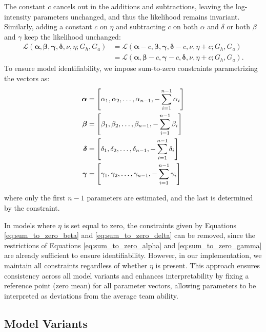 The constant $c$ cancels out in the additions and subtractions, leaving the log-intensity parameters unchanged, and thus the likelihood remains invariant.
Similarly, adding a constant $c$ on $\eta$ and subtracting $c$ on both $\alpha$ and $\delta$ or both $\beta$ and $\gamma$ keep the likelihood unchanged:
\begin{align*}
    \mathcal{L}(\boldsymbol{\alpha}, \boldsymbol{\beta}, \boldsymbol{\gamma}, \boldsymbol{\delta}, \nu, \eta ; G_h, G_a) &  = \mathcal{L}(\boldsymbol{\alpha} - c, \boldsymbol{\beta}, \boldsymbol{\gamma}, \boldsymbol{\delta} - c, \nu, \eta + c ; G_h, G_a) \\
    & = \mathcal{L}(\boldsymbol{\alpha}, \boldsymbol{\beta} - c, \boldsymbol{\gamma} - c, \boldsymbol{\delta}, \nu, \eta + c ; G_h, G_a).
\end{align*}
To ensure model identifiability, we impose sum-to-zero constraints parametrizing the vectors as:
\begin{align}
    \label{eq:sum_to_zero_alpha}
    \boldsymbol{\alpha} &= \left[{\alpha_1, \alpha_2, \ldots, \alpha_{n-1}, -\sum_{i=1}^{n-1} \alpha_i}\right] \\
    \label{eq:sum_to_zero_beta}
    \boldsymbol{\beta} &= \left[{\beta_1, \beta_2, \ldots, \beta_{n-1}, -\sum_{i=1}^{n-1} \beta_i}\right] \\
    \label{eq:sum_to_zero_delta}
    \boldsymbol{\delta} &= \left[{\delta_1, \delta_2, \ldots, \delta_{n-1}, -\sum_{i=1}^{n-1} \delta_i}\right] \\
    \label{eq:sum_to_zero_gamma}
    \boldsymbol{\gamma} &= \left[{\gamma_1, \gamma_2, \ldots, \gamma_{n-1}, -\sum_{i=1}^{n-1} \gamma_i}\right]
\end{align}

\noindent where only the first $n-1$ parameters are estimated, and the last is determined by the constraint.

In models where $\eta$ is set equal to zero, the constraints given by Equations \ref{eq:sum_to_zero_beta} and \ref{eq:sum_to_zero_delta} can be removed, since the restrictions of Equations \ref{eq:sum_to_zero_alpha} and \ref{eq:sum_to_zero_gamma} are already sufficient to ensure identifiability.
However, in our implementation, we maintain all constraints regardless of whether $\eta$ is present.
This approach ensures consistency across all model variants and enhances interpretability by fixing a reference point (zero mean) for all parameter vectors, allowing parameters to be interpreted as deviations from the average team ability.

\subsection{Model Variants}
\label{sec:Poisson_model_variants}

